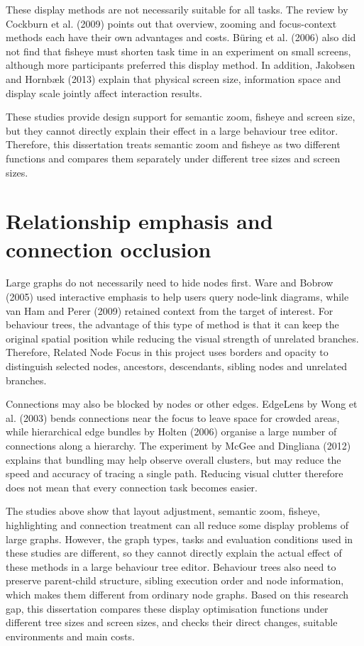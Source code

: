 \documentclass[11pt,a4paper,oneside,extrafontsizes]{memoir}
\begin{document}
These display methods are not necessarily suitable for all tasks. The review by Cockburn et al. (2009) points out that overview, zooming and focus-context methods each have their own advantages and costs. Büring et al. (2006) also did not find that fisheye must shorten task time in an experiment on small screens, although more participants preferred this display method. In addition, Jakobsen and Hornbæk (2013) explain that physical screen size, information space and display scale jointly affect interaction results.

These studies provide design support for semantic zoom, fisheye and screen size, but they cannot directly explain their effect in a large behaviour tree editor. Therefore, this dissertation treats semantic zoom and fisheye as two different functions and compares them separately under different tree sizes and screen sizes.

\section{Relationship emphasis and connection occlusion}

Large graphs do not necessarily need to hide nodes first. Ware and Bobrow (2005) used interactive emphasis to help users query node-link diagrams, while van Ham and Perer (2009) retained context from the target of interest. For behaviour trees, the advantage of this type of method is that it can keep the original spatial position while reducing the visual strength of unrelated branches. Therefore, Related Node Focus in this project uses borders and opacity to distinguish selected nodes, ancestors, descendants, sibling nodes and unrelated branches.

Connections may also be blocked by nodes or other edges. EdgeLens by Wong et al. (2003) bends connections near the focus to leave space for crowded areas, while hierarchical edge bundles by Holten (2006) organise a large number of connections along a hierarchy. The experiment by McGee and Dingliana (2012) explains that bundling may help observe overall clusters, but may reduce the speed and accuracy of tracing a single path. Reducing visual clutter therefore does not mean that every connection task becomes easier.

The studies above show that layout adjustment, semantic zoom, fisheye, highlighting and connection treatment can all reduce some display problems of large graphs. However, the graph types, tasks and evaluation conditions used in these studies are different, so they cannot directly explain the actual effect of these methods in a large behaviour tree editor. Behaviour trees also need to preserve parent-child structure, sibling execution order and node information, which makes them different from ordinary node graphs. Based on this research gap, this dissertation compares these display optimisation functions under different tree sizes and screen sizes, and checks their direct changes, suitable environments and main costs.
\end{document}
